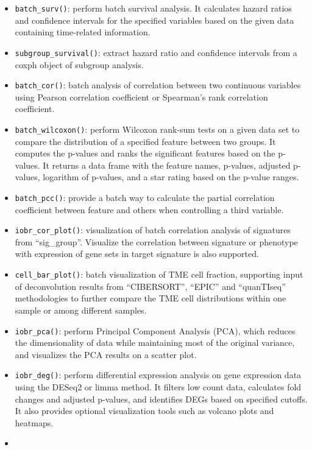 \documentclass[
  12pt,
]{book}
\providecommand{\tightlist}{%
  \setlength{\itemsep}{0pt}\setlength{\parskip}{0pt}}
\begin{document}
\begin{itemize}
  \begin{itemize}
  \tightlist
  \item
    \texttt{batch\_surv()}: perform batch survival analysis. It calculates hazard ratios and confidence intervals for the specified variables based on the given data containing time-related information.
  \item
    \texttt{subgroup\_survival()}: extract hazard ratio and confidence intervals from a coxph object of subgroup analysis.
  \item
    \texttt{batch\_cor()}: batch analysis of correlation between two continuous variables using Pearson correlation coefficient or Spearman's rank correlation coefficient.
  \item
    \texttt{batch\_wilcoxon()}: perform Wilcoxon rank-sum tests on a given data set to compare the distribution of a specified feature between two groups. It computes the p-values and ranks the significant features based on the p-values. It returns a data frame with the feature names, p-values, adjusted p-values, logarithm of p-values, and a star rating based on the p-value ranges.
  \item
    \texttt{batch\_pcc()}: provide a batch way to calculate the partial correlation coefficient between feature and others when controlling a third variable.
  \item
    \texttt{iobr\_cor\_plot()}: visualization of batch correlation analysis of signatures from ``sig\_group''. Visualize the correlation between signature or phenotype with expression of gene sets in target signature is also supported.
  \item
    \texttt{cell\_bar\_plot()}: batch visualization of TME cell fraction, supporting input of deconvolution results from ``CIBERSORT'', ``EPIC'' and ``quanTIseq'' methodologies to further compare the TME cell distributions within one sample or among different samples.
  \item
    \texttt{iobr\_pca()}: perform Principal Component Analysis (PCA), which reduces the dimensionality of data while maintaining most of the original variance, and visualizes the PCA results on a scatter plot.
  \item
    \texttt{iobr\_deg()}: perform differential expression analysis on gene expression data using the DESeq2 or limma method. It filters low count data, calculates fold changes and adjusted p-values, and identifies DEGs based on specified cutoffs. It also provides optional visualization tools such as volcano plots and heatmaps.
  \item

\end{itemize}
\end{itemize}
\end{document}
